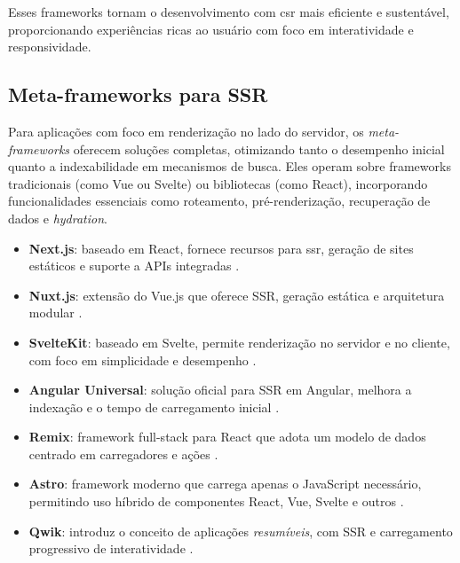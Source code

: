Esses frameworks tornam o desenvolvimento com \acrshort{csr} mais eficiente e sustentável, proporcionando experiências ricas ao usuário com foco em interatividade e responsividade.

\subsection{Meta-frameworks para SSR}
\label{subsec:frameworks-ssr}

Para aplicações com foco em renderização no lado do servidor, os \emph{meta-frameworks} oferecem soluções completas, otimizando tanto o desempenho inicial quanto a indexabilidade em mecanismos de busca. Eles operam sobre frameworks tradicionais (como Vue ou Svelte) ou bibliotecas (como React), incorporando funcionalidades essenciais como roteamento, pré-renderização, recuperação de dados e \textit{hydration}.

\begin{itemize}
    \item \textbf{Next.js}: baseado em React, fornece recursos para \acrshort{ssr}, geração de sites estáticos e suporte a APIs integradas \cite{nextjs2024}.
    
    \item \textbf{Nuxt.js}: extensão do Vue.js que oferece SSR, geração estática e arquitetura modular \cite{nuxtjs2024}.
    
    \item \textbf{SvelteKit}: baseado em Svelte, permite renderização no servidor e no cliente, com foco em simplicidade e desempenho \cite{sveltekit2024}.
    
    \item \textbf{Angular Universal}: solução oficial para SSR em Angular, melhora a indexação e o tempo de carregamento inicial \cite{angularuniversal2024}.
    
    \item \textbf{Remix}: framework full-stack para React que adota um modelo de dados centrado em carregadores e ações \cite{remix2024}.
    
    \item \textbf{Astro}: framework moderno que carrega apenas o JavaScript necessário, permitindo uso híbrido de componentes React, Vue, Svelte e outros \cite{astro2024}.
    
    \item \textbf{Qwik}: introduz o conceito de aplicações \textit{resumíveis}, com SSR e carregamento progressivo de interatividade \cite{qwik2024}.
\end{itemize}

